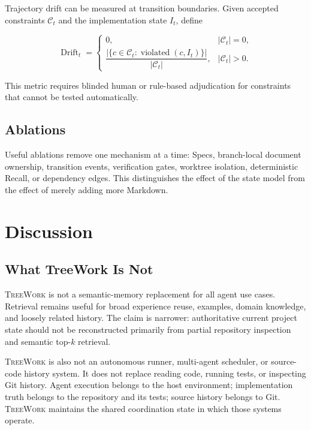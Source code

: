 \documentclass[11pt]{article}
\newcommand{\system}{\textsc{TreeWork}\xspace}
\theoremstyle{definition}
\begin{document}
Trajectory drift can be measured at transition boundaries.  Given accepted
constraints $\mathcal{C}_t$ and the implementation state $I_t$, define

\begin{equation}
  \operatorname{Drift}_t
  =
  \begin{cases}
    0, & |\mathcal{C}_t|=0,\\[2pt]
    \dfrac{
      \left|\{c\in\mathcal{C}_t:\operatorname{violated}(c,I_t)\}\right|
    }{
      |\mathcal{C}_t|
    }, & |\mathcal{C}_t|>0.
  \end{cases}
  \label{eq:drift}
\end{equation}

This metric requires blinded human or rule-based adjudication for constraints
that cannot be tested automatically.

\subsection{Ablations}

Useful ablations remove one mechanism at a time: Specs, branch-local document
ownership, transition events, verification gates, worktree isolation,
deterministic Recall, or dependency edges.  This distinguishes the effect of
the state model from the effect of merely adding more Markdown.

\section{Discussion}

\subsection{What TreeWork Is Not}

\system is not a semantic-memory replacement for all agent use cases.  Retrieval
remains useful for broad experience reuse, examples, domain knowledge, and
loosely related history.  The claim is narrower: authoritative current project
state should not be reconstructed primarily from partial repository inspection
and semantic top-$k$ retrieval.

\system is also not an autonomous runner, multi-agent scheduler, or source-code
history system.  It does not replace reading code, running tests, or inspecting
Git history.  Agent execution belongs to the host environment; implementation
truth belongs to the repository and its tests; source history belongs to Git.
\system maintains the shared coordination state in which those systems
operate.
\end{document}
